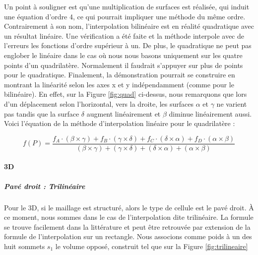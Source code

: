 Un point à souligner est qu'une multiplication de surfaces est réalisée, qui induit une équation d'ordre 4, ce qui pourrait impliquer une méthode du même ordre.
Contrairement à son nom, l'interpolation bilinéaire est en réalité quadratique avec un résultat linéaire.
Une vérification a été faite et la méthode interpole avec de l'erreurs les fonctions d'ordre supérieur à un.
De plus, le quadratique ne peut pas englober le linéaire dans le cas où nous nous basons uniquement sur les quatre points d'un quadrilatère.
Normalement il faudrait s'appuyer sur plus de points pour le quadratique. 
Finalement, la démonstration pourrait se construire en montrant la linéarité selon les axes x et y indépendamment (comme pour le bilinéaire). En effet, sur la Figure \ref{fig:quad} ci-dessus, nous remarquons que lors d'un déplacement selon l'horizontal, vers la droite, les surfaces \(\alpha\) et \(\gamma\) ne varient pas tandis que la surface \(\delta\) augment linéairement et \(\beta\) diminue linéairement aussi.
Voici l'équation de la méthode d'interpolation linéaire pour le quadrilatère :

\begin{equation}
    f(P) = \frac{f_{A} \cdot (\beta \times \gamma) + f_{B} \cdot (\gamma \times \delta) + f_{C} \cdot (\delta \times \alpha) + f_{D} \cdot (\alpha \times \beta)}{(\beta \times \gamma) + (\gamma \times \delta) + (\delta \times \alpha) + (\alpha \times \beta)}
\end{equation}
    

\vspace{0.2cm}  %


\paragraph{3D}
\subparagraph{Pavé droit : Trilinéaire}

Pour le 3D, si le maillage est structuré, alors le type de cellule est le pavé droit. À ce moment, nous sommes dans le cas de l'interpolation dite trilinéaire. La formule se trouve facilement dans la littérature et peut être retrouvée par extension de la formule de l'interpolation sur un rectangle. Nous associons comme poids à un des huit sommets \( s_1 \) le volume opposé, construit tel que sur la Figure \ref{fig:trilineaire}

